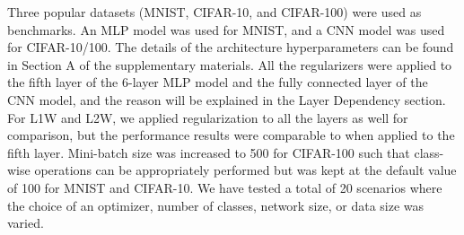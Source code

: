 \documentclass[letterpaper]{article} %
\begin{document}
\begin{table}[t]
\centering
\caption{Error performance (\%) for CIFAR-100 CNN model.}
\label{table:cifar-100}
\end{table}

Three popular datasets (MNIST, CIFAR-10, and CIFAR-100) were used as benchmarks. An MLP model was used for MNIST, and a CNN model was used for CIFAR-10/100. The details of the architecture hyperparameters can be found in Section A of the supplementary materials. All the regularizers were applied to the fifth layer of the 6-layer MLP model and the fully connected layer of the CNN model, and the reason will be explained in the Layer Dependency section. For L1W and L2W, we applied regularization to all the layers as well for comparison, but the performance results were comparable to when applied to the fifth layer. Mini-batch size was increased to 500 for CIFAR-100 such that class-wise operations can be appropriately performed but was kept at the default value of 100 for MNIST and CIFAR-10. We have tested a total of 20 scenarios where the choice of an optimizer, number of classes, network size, or data size was varied.
\end{document}
